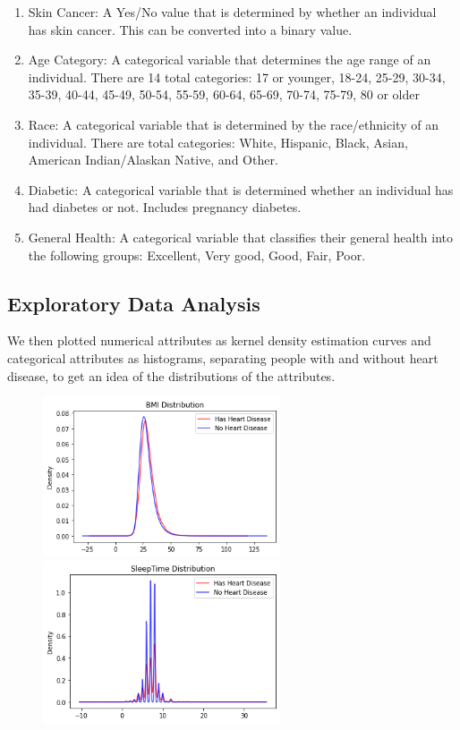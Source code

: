 \documentclass[a4paper]{article}
\begin{document}
\begin{enumerate}
\item Skin Cancer: A Yes/No value that is determined by whether an individual has skin cancer. This can be converted into a binary value.
\item Age Category: A categorical variable that determines the age range of an individual. There are 14 total categories: 17 or younger, 18-24, 25-29, 30-34, 35-39, 40-44, 45-49, 50-54, 55-59, 60-64, 65-69, 70-74, 75-79, 80 or older
\item Race: A categorical variable that is determined by the race/ethnicity of an individual. There are total categories: White, Hispanic, Black, Asian, American Indian/Alaskan Native, and Other.
\item Diabetic: A categorical variable that is determined whether an individual has had diabetes or not. Includes pregnancy diabetes.
\item General Health: A categorical variable that classifies their general health into the following groups: Excellent, Very good, Good, Fair, Poor.
 \end{enumerate}
 
 \subsection{Exploratory Data Analysis}

We then plotted numerical attributes as kernel density estimation curves and categorical attributes as histograms, separating people with and without heart disease, to get an idea of the distributions of the attributes.

\begin{figure}[H]
    \centering
    \includegraphics[width=7cm]{images/bmi.png}
    \includegraphics[width=7cm]{images/sleeptime.png}
\end{figure}
\end{document}
